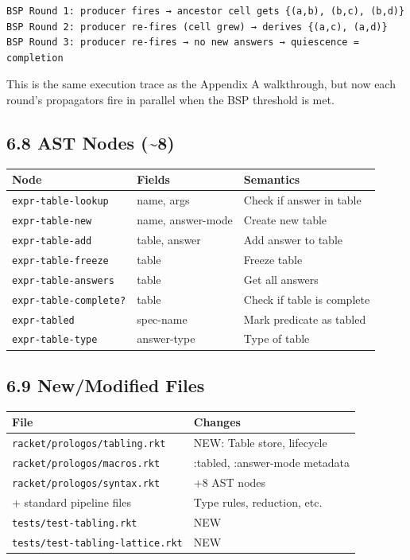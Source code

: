 \documentclass[11pt]{article}
\begin{document}
\begin{verbatim}
BSP Round 1: producer fires → ancestor cell gets {(a,b), (b,c), (b,d)}
BSP Round 2: producer re-fires (cell grew) → derives {(a,c), (a,d)}
BSP Round 3: producer re-fires → no new answers → quiescence = completion
\end{verbatim}

This is the same execution trace as the Appendix A walkthrough, but now each
round's propagators fire in parallel when the BSP threshold is met.
\subsection{6.8 AST Nodes (\textasciitilde{}8)}
\label{sec:org16563f0}

\begin{center}
\begin{tabular}{lll}
Node & Fields & Semantics\\
\hline
\texttt{expr-table-lookup} & name, args & Check if answer in table\\
\texttt{expr-table-new} & name, answer-mode & Create new table\\
\texttt{expr-table-add} & table, answer & Add answer to table\\
\texttt{expr-table-freeze} & table & Freeze table\\
\texttt{expr-table-answers} & table & Get all answers\\
\texttt{expr-table-complete?} & table & Check if table is complete\\
\texttt{expr-tabled} & spec-name & Mark predicate as tabled\\
\texttt{expr-table-type} & answer-type & Type of table\\
\end{tabular}
\end{center}
\subsection{6.9 New/Modified Files}
\label{sec:orga6e62d4}

\begin{center}
\begin{tabular}{ll}
File & Changes\\
\hline
\texttt{racket/prologos/tabling.rkt} & NEW: Table store, lifecycle\\
\texttt{racket/prologos/macros.rkt} & :tabled, :answer-mode metadata\\
\texttt{racket/prologos/syntax.rkt} & +8 AST nodes\\
+ standard pipeline files & Type rules, reduction, etc.\\
\texttt{tests/test-tabling.rkt} & NEW\\
\texttt{tests/test-tabling-lattice.rkt} & NEW\\
\end{tabular}
\end{center}
\end{document}
